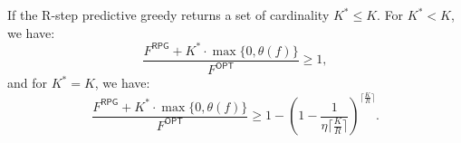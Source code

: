 \begin{theorem}  \label{thm:bounds-on-RPG}
If the R-step predictive greedy returns a set of cardinality $K^* \leq K$.
For $K^* < K$, we have:
\[
\frac{F^{\textsf{RPG}} + K^* \cdot \max \{ 0, \theta(f) \}}{F^{\textsf{OPT}}} \geq 1,
\]
and for $K^* = K$, we have: 
\[
\frac{F^{\textsf{RPG}} + K^* \cdot \max \{ 0, \theta(f) \}}{F^{\textsf{OPT}}} \geq 1 - \left(1 - \frac{1}{\eta \lceil \frac{K}{R} \rceil}\right)^{\lceil \frac{K}{R} \rceil}.
\]
\end{theorem}
